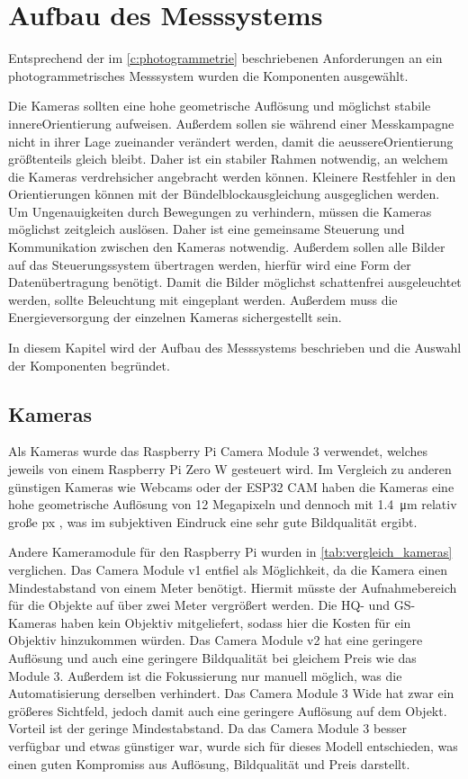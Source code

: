\documentclass[./00PhotoBox.tex]{subfiles}
\begin{document}
\chapter{Aufbau des Messsystems}
\label{c:aufbau}
Entsprechend der im \autoref{c:photogrammetrie} beschriebenen Anforderungen an ein photogrammetrisches Messsystem wurden die Komponenten ausgewählt.

Die Kameras sollten eine hohe geometrische Auflösung und möglichst stabile \gls{innereOrientierung} aufweisen. Außerdem sollen sie während einer Messkampagne nicht in ihrer Lage zueinander verändert werden, damit die \gls{aeussereOrientierung} größtenteils gleich bleibt. Daher ist ein stabiler Rahmen notwendig, an welchem die Kameras verdrehsicher angebracht werden können. Kleinere Restfehler in den Orientierungen können mit der Bündelblockausgleichung ausgeglichen werden.
Um Ungenauigkeiten durch Bewegungen zu verhindern, müssen die Kameras möglichst zeitgleich auslösen. Daher ist eine gemeinsame Steuerung und Kommunikation zwischen den Kameras notwendig. Außerdem sollen alle Bilder auf das Steuerungssystem übertragen werden, hierfür wird eine Form der Datenübertragung benötigt. Damit die Bilder möglichst schattenfrei ausgeleuchtet werden, sollte Beleuchtung mit eingeplant werden. Außerdem muss die Energieversorgung der einzelnen Kameras sichergestellt sein.

In diesem Kapitel wird der Aufbau des Messsystems beschrieben und die Auswahl der Komponenten begründet.

\section{Kameras}
\label{s:kameras}
Als Kameras wurde das Raspberry Pi Camera Module 3 verwendet, welches jeweils von einem Raspberry Pi Zero W gesteuert wird. Im Vergleich zu anderen günstigen Kameras wie Webcams oder der ESP32 CAM haben die Kameras eine hohe geometrische Auflösung von 12 Megapixeln und dennoch mit \SI{1,4}{\micro\metre} relativ große \acrfull{px} \citep{raspicamdatasheet}, was im subjektiven Eindruck eine sehr gute Bildqualität ergibt.

Andere Kameramodule für den Raspberry Pi wurden in \autoref{tab:vergleich_kameras} verglichen. Das Camera Module v1 entfiel als Möglichkeit, da die Kamera einen Mindestabstand von einem Meter benötigt. Hiermit müsste der Aufnahmebereich für die Objekte auf über zwei Meter vergrößert werden. Die HQ- und GS-Kameras haben kein Objektiv mitgeliefert, sodass hier die Kosten für ein Objektiv hinzukommen würden. Das Camera Module v2 hat eine geringere Auflösung und auch eine geringere Bildqualität bei gleichem Preis wie das Module 3. Außerdem ist die Fokussierung nur manuell möglich, was die Automatisierung derselben verhindert. Das Camera Module 3 Wide hat zwar ein größeres Sichtfeld, jedoch damit auch eine geringere Auflösung auf dem Objekt. Vorteil ist der geringe Mindestabstand. Da das Camera Module 3 besser verfügbar und etwas günstiger war, wurde sich für dieses Modell entschieden, was einen guten Kompromiss aus Auflösung, Bildqualität und Preis darstellt.
\end{document}
